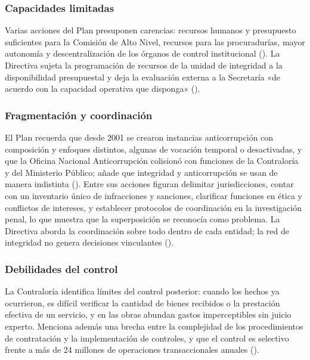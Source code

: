 \documentclass[Afour,sageh,times]{sagej}
\begin{document}
\subsubsection*{Capacidades limitadas}
Varias acciones del Plan presuponen carencias: recursos humanos y presupuesto suficientes para la Comisión de Alto Nivel, recursos para las procuradurías, mayor autonomía y descentralización de los órganos de control institucional (\citealp{pcm2018plan}). La Directiva sujeta la programación de recursos de la unidad de integridad a la disponibilidad presupuestal y deja la evaluación externa a la Secretaría «de acuerdo con la capacidad operativa que disponga» (\citealp{pcm2026directiva}).

\subsubsection*{Fragmentación y coordinación}
El Plan recuerda que desde 2001 se crearon instancias anticorrupción con composición y enfoques distintos, algunas de vocación temporal o desactivadas, y que la Oficina Nacional Anticorrupción colisionó con funciones de la Contraloría y del Ministerio Público; añade que integridad y anticorrupción se usan de manera indistinta (\citealp{pcm2018plan}). Entre sus acciones figuran delimitar jurisdicciones, contar con un inventario único de infracciones y sanciones, clarificar funciones en ética y conflictos de intereses, y establecer protocolos de coordinación en la investigación penal, lo que muestra que la superposición se reconocía como problema. La Directiva aborda la coordinación sobre todo dentro de cada entidad; la red de integridad no genera decisiones vinculantes (\citealp{pcm2026directiva}).

\subsubsection*{Debilidades del control}
La Contraloría identifica límites del control posterior: cuando los hechos ya ocurrieron, es difícil verificar la cantidad de bienes recibidos o la prestación efectiva de un servicio, y en las obras abundan gastos imperceptibles sin juicio experto. Menciona además una brecha entre la complejidad de los procedimientos de contratación y la implementación de controles, y que el control es selectivo frente a más de 24 millones de operaciones transaccionales anuales (\citealp{contraloria2020corrupcion}).
\end{document}

